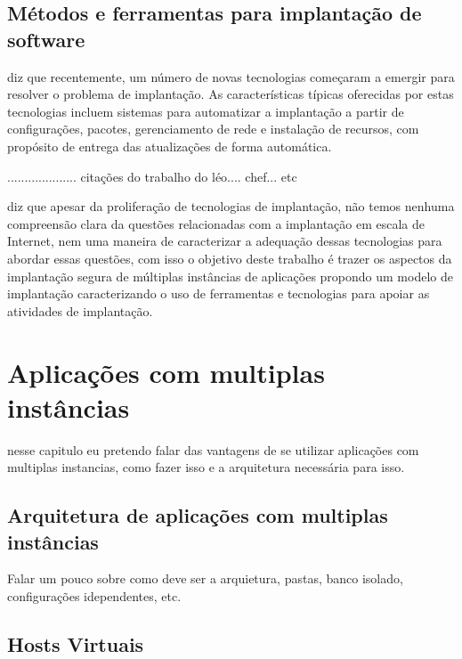 \subsection{Métodos e ferramentas para implantação de software}
\label{subsec:metodoseferramentas}


\cite{deployment1998} diz que recentemente, um número de novas tecnologias
começaram a emergir para resolver o problema de implantação. As características
típicas oferecidas por estas tecnologias incluem sistemas para automatizar a
implantação a partir de configurações, pacotes, gerenciamento de rede
e instalação de recursos, com  propósito de entrega das atualizações de forma
automática.


.................... citações do trabalho do léo.... chef... etc

\cite{deployment1998} diz que  apesar da proliferação de tecnologias de
implantação, não temos nenhuma compreensão clara da questões relacionadas com a
implantação em escala de Internet, nem uma maneira de caracterizar a adequação
dessas tecnologias para abordar essas questões, com isso o objetivo deste trabalho
é trazer os aspectos da implantação segura de múltiplas instâncias de aplicações
propondo um modelo de implantação caracterizando o uso de ferramentas e tecnologias
para apoiar as atividades de implantação.



\section{Aplicações com multiplas instâncias}
\label{cap-multiplas}

nesse capitulo eu pretendo falar das vantagens de se utilizar aplicações com
multiplas instancias, como fazer isso e a arquitetura necessária para isso.

\subsection{Arquitetura de aplicações com multiplas instâncias}

Falar um pouco sobre como deve ser a arquietura, pastas, banco isolado,
configurações idependentes, etc.

\subsection{Hosts Virtuais}

